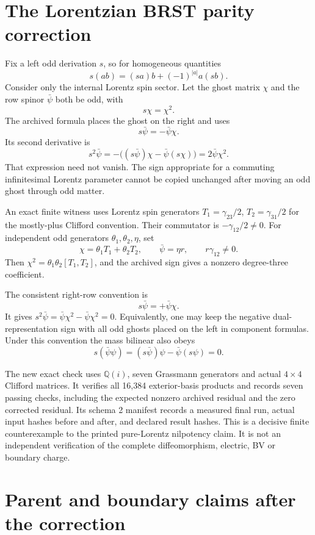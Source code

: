 \clearpage
\section{The Lorentzian BRST parity correction}\label{c:verify:parity}

Fix a left odd derivation \(s\), so for homogeneous quantities
\[
 s(ab)=(sa)b+(-1)^{|a|}a(sb).
\]
Consider only the internal Lorentz spin sector. Let the ghost matrix \(\chi\) and the row spinor \(\bar\psi\) both be odd, with
\[
 s\chi=\chi^2.
\]
The archived formula places the ghost on the right and uses
\[
 s\bar\psi=-\bar\psi\chi.
\]
Its second derivative is
\[
 s^2\bar\psi
 =-\big((s\bar\psi)\chi-\bar\psi(s\chi)\big)
 =2\bar\psi\chi^2.
\]
That expression need not vanish. The sign appropriate for a commuting infinitesimal Lorentz parameter cannot be copied unchanged after moving an odd ghost through odd matter.

An exact finite witness uses Lorentz spin generators \(T_1=\gamma_{23}/2\), \(T_2=\gamma_{31}/2\) for the mostly-plus Clifford convention. Their commutator is \(-\gamma_{12}/2\ne0\). For independent odd generators \(\theta_1,\theta_2,\eta\), set
\[
 \chi=\theta_1T_1+\theta_2T_2,
 \qquad \bar\psi=\eta r,
 \qquad r\gamma_{12}\ne0.
\]
Then \(\chi^2=\theta_1\theta_2[T_1,T_2]\), and the archived sign gives a nonzero degree-three coefficient.

The consistent right-row convention is
\[
 s\bar\psi=+\bar\psi\chi.
\]
It gives \(s^2\bar\psi=\bar\psi\chi^2-\bar\psi\chi^2=0\). Equivalently, one may keep the negative dual-representation sign with all odd ghosts placed on the left in component formulas. Under this convention the mass bilinear also obeys
\[
 s(\bar\psi\psi)=(s\bar\psi)\psi-\bar\psi(s\psi)=0.
\]

The new exact check uses \(\mathbb Q(i)\), seven Grassmann generators and actual \(4\times4\) Clifford matrices. It verifies all 16,384 exterior-basis products and records seven passing checks, including the expected nonzero archived residual and the zero corrected residual. Its schema 2 manifest records a measured final run, actual input hashes before and after, and declared result hashes. This is a decisive finite counterexample to the printed pure-Lorentz nilpotency claim. It is not an independent verification of the complete diffeomorphism, electric, BV or boundary charge.



\clearpage
\section{Parent and boundary claims after the correction}\label{c:verify:boundary}

